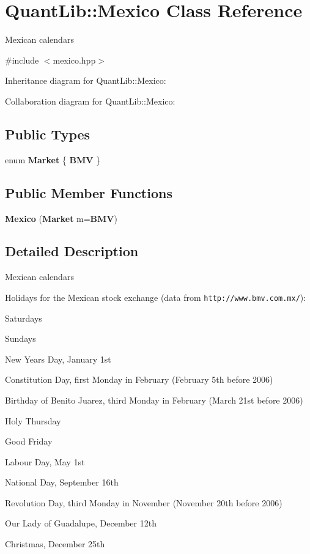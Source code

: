 \section{Quant\+Lib\+:\+:Mexico Class Reference}
\label{class_quant_lib_1_1_mexico}


Mexican calendars  




{\ttfamily \#include $<$mexico.\+hpp$>$}



Inheritance diagram for Quant\+Lib\+:\+:Mexico\+:


Collaboration diagram for Quant\+Lib\+:\+:Mexico\+:
\subsection*{Public Types}
\begin{DoxyCompactItemize}
\item 
enum {\bf Market} \{ {\bf B\+MV}
 \}
\end{DoxyCompactItemize}
\subsection*{Public Member Functions}
\begin{DoxyCompactItemize}
\item 
{\bf Mexico} ({\bf Market} m={\bf B\+MV})
\end{DoxyCompactItemize}


\subsection{Detailed Description}
Mexican calendars 

Holidays for the Mexican stock exchange (data from {\tt http\+://www.\+bmv.\+com.\+mx/})\+: 
\begin{DoxyItemize}
\item Saturdays 
\item Sundays 
\item New Year\textquotesingle{}s Day, January 1st 
\item Constitution Day, first Monday in February (February 5th before 2006) 
\item Birthday of Benito Juarez, third Monday in February (March 21st before 2006) 
\item Holy Thursday 
\item Good Friday 
\item Labour Day, May 1st 
\item National Day, September 16th 
\item Revolution Day, third Monday in November (November 20th before 2006) 
\item Our Lady of Guadalupe, December 12th 
\item Christmas, December 25th 
\end{DoxyItemize}

